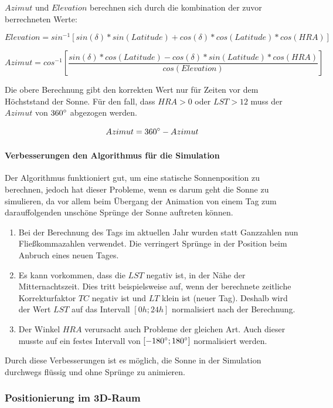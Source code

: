 $Azimut$ und $Elevation$ berechnen sich durch die kombination der zuvor berrechneten Werte:

\[ Elevation = sin^{-1} \left[sin(\delta)*sin(Latitude) + cos(\delta)*cos(Latitude)*cos(HRA)\right] \]

\[ Azimut = cos^{-1} \left[\frac{sin(\delta)*cos(Latitude) - cos(\delta)*sin(Latitude)*cos(HRA)}{cos(Elevation)}\right] \]

Die obere Berechnung gibt den korrekten Wert nur für Zeiten vor dem Höchststand der Sonne. Für den fall, dass $HRA > 0$ oder $LST > 12$ muss der $Azimut$ von $360\degree$ abgezogen werden.

\[ Azimut = 360\degree - Azimut \]

\paragraph{Verbesserungen den Algorithmus für die Simulation}

Der Algorithmus funktioniert gut, um eine statische Sonnenposition zu berechnen, jedoch hat dieser Probleme, wenn es darum geht die Sonne zu simulieren, da vor allem beim Übergang der Animation von einem Tag zum darauffolgenden unschöne Sprünge der Sonne auftreten können.

\begin{enumerate}
    \item Bei der Berechnung des Tags im aktuellen Jahr wurden statt Ganzzahlen nun Fließkommazahlen verwendet. Die verringert Sprünge in der Position beim Anbruch eines neuen Tages.
    \item Es kann vorkommen, dass die $LST$ negativ ist, in der Nähe der Mitternachtszeit. Dies tritt beispielsweise auf, wenn der berechnete zeitliche Korrekturfaktor $TC$ negativ ist und $LT$ klein ist (neuer Tag). Deshalb wird der Wert $LST$ auf das Intervall $[0h; 24h]$ normalisiert nach der Berechnung.
    \item Der Winkel $HRA$ verursacht auch Probleme der gleichen Art. Auch dieser musste auf ein festes Intervall von $[-180\degree; 180\degree]$ normalisiert werden.
\end{enumerate}

Durch diese Verbesserungen ist es möglich, die Sonne in der Simulation durchwegs flüssig und ohne Sprünge zu animieren.

\subsubsection{Positionierung im 3D-Raum}

